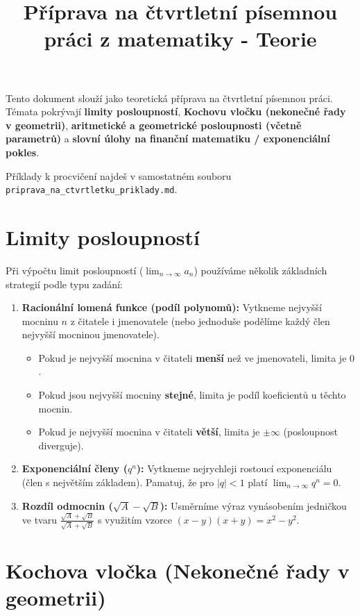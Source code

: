 \documentclass[12pt,a4paper]{article}
\title{Příprava na čtvrtletní písemnou práci z matematiky - Teorie}
\date{}
\author{}
\begin{document}
\maketitle

Tento dokument slouží jako teoretická příprava na čtvrtletní písemnou práci. Témata pokrývají \textbf{limity posloupností}, \textbf{Kochovu vločku (nekonečné řady v geometrii)}, \textbf{aritmetické a geometrické posloupnosti (včetně parametrů)} a \textbf{slovní úlohy na finanční matematiku / exponenciální pokles}.

Příklady k procvičení najdeš v samostatném souboru \texttt{priprava\_na\_ctvrtletku\_priklady.md}.

\section{Limity posloupností}

Při výpočtu limit posloupností ($\lim_{n \to \infty} a_n$) používáme několik základních strategií podle typu zadání:

\begin{enumerate}
    \item \textbf{Racionální lomená funkce (podíl polynomů):} Vytkneme nejvyšší mocninu $n$ z čitatele i jmenovatele (nebo jednoduše podělíme každý člen nejvyšší mocninou jmenovatele).
    \begin{itemize}
        \item Pokud je nejvyšší mocnina v čitateli \textbf{menší} než ve jmenovateli, limita je $0$.
        \item Pokud jsou nejvyšší mocniny \textbf{stejné}, limita je podíl koeficientů u těchto mocnin.
        \item Pokud je nejvyšší mocnina v čitateli \textbf{větší}, limita je $\pm\infty$ (posloupnost diverguje).
    \end{itemize}
    \item \textbf{Exponenciální členy ($q^n$):} Vytkneme nejrychleji rostoucí exponenciálu (člen s největším základem). Pamatuj, že pro $|q| < 1$ platí $\lim_{n \to \infty} q^n = 0$.
    \item \textbf{Rozdíl odmocnin ($\sqrt{A} - \sqrt{B}$):} Usměrníme výraz vynásobením jedničkou ve tvaru $\frac{\sqrt{A} + \sqrt{B}}{\sqrt{A} + \sqrt{B}}$ s využitím vzorce $(x-y)(x+y) = x^2 - y^2$.
\end{enumerate}

\section{Kochova vločka (Nekonečné řady v geometrii)}
\end{document}
